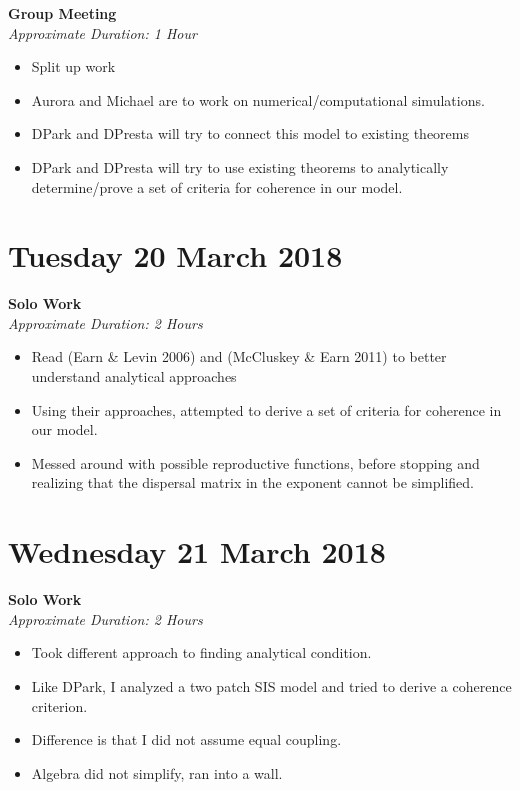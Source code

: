 \documentclass[12pt]{article}\usepackage[]{graphicx}\usepackage[]{color}
\begin{document}
\textbf{Group Meeting} \\
\emph{Approximate Duration: 1 Hour}

\begin{itemize}
\item Split up work 
\item Aurora and Michael are to work on numerical/computational simulations.
\item DPark and DPresta will try to connect this model to existing theorems
\item DPark and DPresta will try to use existing theorems to analytically determine/prove a set of criteria for coherence in our model.
\end{itemize}

\section*{Tuesday 20 March 2018}

\textbf{Solo Work} \\
\emph{Approximate Duration: 2 Hours}

\begin{itemize}
\item Read (Earn \& Levin 2006) and (McCluskey \& Earn 2011) to better understand analytical approaches
\item Using their approaches, attempted to derive a set of criteria for coherence in our model.
\item Messed around with possible reproductive functions, before stopping and realizing that the dispersal matrix in the exponent cannot be simplified.
\end{itemize}

\section*{Wednesday 21 March 2018}

\textbf{Solo Work} \\
\emph{Approximate Duration: 2 Hours}

\begin{itemize}
\item Took different approach to finding analytical condition.
\item Like DPark, I analyzed a two patch SIS model and tried to derive a coherence criterion.
\item Difference is that I did not assume equal coupling.
\item Algebra did not simplify, ran into a wall.
\end{itemize}
\end{document}
